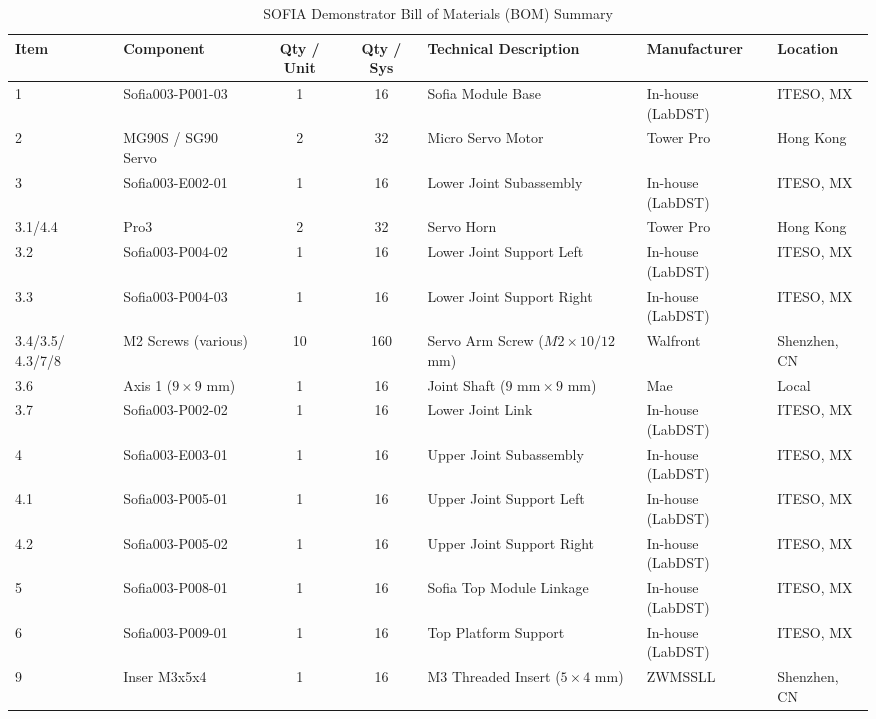 \documentclass[lettersize,journal]{IEEEtran}
\begin{document}
	
	\begin{table}[!t]
		\centering
		\caption{SOFIA Demonstrator Bill of Materials (BOM) Summary}
		\label{tab:bom}
		\tiny
		
		\setlength{\tabcolsep}{1.5pt}
		\renewcommand{\arraystretch}{1.05}
		
		\begin{tabularx}{\columnwidth}{@{}P{0.8cm} P{2.0cm} c c X P{1.1cm} P{0.8cm}@{}}
			\toprule
			\textbf{Item} & \textbf{Component} & \textbf{Qty / Unit} & \textbf{Qty / Sys} & \textbf{Technical Description} & \textbf{Manufacturer} & \textbf{Location} \\
			\midrule
			
			1 & Sofia003-P001-03 & 1 & 16 & Sofia Module Base & In-house (LabDST) & ITESO, MX \\
			2 & MG90S / SG90 Servo & 2 & 32 & Micro Servo Motor & Tower Pro & Hong Kong \\
			3 & Sofia003-E002-01 & 1 & 16 & Lower Joint Subassembly & In-house (LabDST) & ITESO, MX \\
			3.1/4.4 & Pro3 & 2 & 32 & Servo Horn & Tower Pro & Hong Kong \\
			3.2 & Sofia003-P004-02 & 1 & 16 & Lower Joint Support Left & In-house (LabDST) & ITESO, MX \\
			3.3 & Sofia003-P004-03 & 1 & 16 & Lower Joint Support Right & In-house (LabDST) & ITESO, MX \\
			3.4/3.5/ 4.3/7/8 & M2 Screws (various) & 10 & 160 & Servo Arm Screw ($M2 \times 10/12$ mm) & Walfront & Shenzhen, CN \\
			3.6 & Axis 1 ($9 \times 9$ mm) & 1 & 16 & Joint Shaft ($9\text{ mm} \times 9\text{ mm}$) & Mae & Local \\
			3.7 & Sofia003-P002-02 & 1 & 16 & Lower Joint Link & In-house (LabDST) & ITESO, MX \\
			4 & Sofia003-E003-01 & 1 & 16 & Upper Joint Subassembly & In-house (LabDST) & ITESO, MX \\
			4.1 & Sofia003-P005-01 & 1 & 16 & Upper Joint Support Left & In-house (LabDST) & ITESO, MX \\
			4.2 & Sofia003-P005-02 & 1 & 16 & Upper Joint Support Right & In-house (LabDST) & ITESO, MX \\
			5 & Sofia003-P008-01 & 1 & 16 & Sofia Top Module Linkage & In-house (LabDST) & ITESO, MX \\
			6 & Sofia003-P009-01 & 1 & 16 & Top Platform Support & In-house (LabDST) & ITESO, MX \\
			9 & Inser M3x5x4 & 1 & 16 & M3 Threaded Insert ($5 \times 4$ mm) & ZWMSSLL & Shenzhen, CN \\

\end{tabularx}
\end{table}
\end{document}
